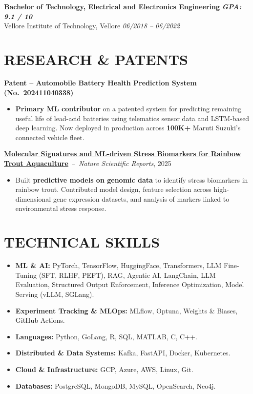 \documentclass[9pt]{article}
\begin{document}
\textbf{Bachelor of Technology, Electrical and Electronics Engineering} \hfill \textbf{\textit{GPA: 9.1 / 10}}\\
Vellore Institute of Technology, Vellore \hfill \textit{06/2018 -- 06/2022}

\vspace{2pt}

\section*{RESEARCH \& PATENTS}

\textbf{Patent -- Automobile Battery Health Prediction System (No.~202411040338)}
\begin{itemize}
    \item \textbf{Primary ML contributor} on a patented system for predicting remaining useful life of lead-acid batteries using telematics sensor data and LSTM-based deep learning. Now deployed in production across \textbf{100K+} Maruti Suzuki's connected vehicle fleet.
\end{itemize}


\textbf{\href{https://www.nature.com/articles/s41598-025-30120-3}{Molecular Signatures and ML-driven Stress Biomarkers for Rainbow Trout Aquaculture}}~--~\textit{Nature Scientific Reports}, 2025
\begin{itemize}
    \item Built \textbf{predictive models on genomic data} to identify stress biomarkers in rainbow trout. Contributed model design, feature selection across high-dimensional gene expression datasets, and analysis of markers linked to environmental stress response.
\end{itemize}

\section*{TECHNICAL SKILLS}
\begin{itemize}
    \item \textbf{ML \& AI:} PyTorch, TensorFlow, HuggingFace, Transformers, LLM Fine-Tuning (SFT, RLHF, PEFT), RAG, Agentic AI, LangChain, LLM Evaluation, Structured Output Enforcement, Inference Optimization, Model Serving (vLLM, SGLang).
    \item \textbf{Experiment Tracking \& MLOps:} MLflow, Optuna, Weights \& Biases, GitHub Actions.
    \item \textbf{Languages:} Python, GoLang, R, SQL, MATLAB, C, C++.
    \item \textbf{Distributed \& Data Systems:} Kafka, FastAPI,  Docker, Kubernetes.
    \item \textbf{Cloud \& Infrastructure:} GCP, Azure, AWS, Linux, Git.
    \item \textbf{Databases:} PostgreSQL, MongoDB, MySQL, OpenSearch, Neo4j.
\end{itemize}
\end{document}
